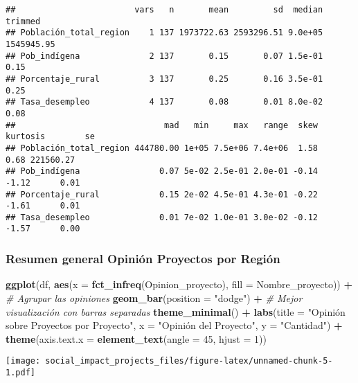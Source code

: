 \documentclass[
]{article}
\newenvironment{Shaded}{\begin{snugshade}}{\end{snugshade}}
\newcommand{\AttributeTok}[1]{\textcolor[rgb]{0.13,0.29,0.53}{#1}}
\newcommand{\CommentTok}[1]{\textcolor[rgb]{0.56,0.35,0.01}{\textit{#1}}}
\newcommand{\DecValTok}[1]{\textcolor[rgb]{0.00,0.00,0.81}{#1}}
\newcommand{\FunctionTok}[1]{\textcolor[rgb]{0.13,0.29,0.53}{\textbf{#1}}}
\newcommand{\NormalTok}[1]{#1}
\newcommand{\SpecialCharTok}[1]{\textcolor[rgb]{0.81,0.36,0.00}{\textbf{#1}}}
\newcommand{\StringTok}[1]{\textcolor[rgb]{0.31,0.60,0.02}{#1}}
\begin{document}
\begin{verbatim}
##                        vars   n       mean         sd  median    trimmed
## Población_total_region    1 137 1973722.63 2593296.51 9.0e+05 1545945.95
## Pob_indígena              2 137       0.15       0.07 1.5e-01       0.15
## Porcentaje_rural          3 137       0.25       0.16 3.5e-01       0.25
## Tasa_desempleo            4 137       0.08       0.01 8.0e-02       0.08
##                              mad   min     max   range  skew kurtosis        se
## Población_total_region 444780.00 1e+05 7.5e+06 7.4e+06  1.58     0.68 221560.27
## Pob_indígena                0.07 5e-02 2.5e-01 2.0e-01 -0.14    -1.12      0.01
## Porcentaje_rural            0.15 2e-02 4.5e-01 4.3e-01 -0.22    -1.61      0.01
## Tasa_desempleo              0.01 7e-02 1.0e-01 3.0e-02 -0.12    -1.57      0.00
\end{verbatim}

\subsubsection{\texorpdfstring{\textbf{Resumen general Opinión Proyectos
por
Región}}{Resumen general Opinión Proyectos por Región}}\label{resumen-general-opiniuxf3n-proyectos-por-regiuxf3n}

\begin{Shaded}
\begin{Highlighting}[]
\FunctionTok{ggplot}\NormalTok{(df, }\FunctionTok{aes}\NormalTok{(}\AttributeTok{x =} \FunctionTok{fct\_infreq}\NormalTok{(Opinion\_proyecto), }\AttributeTok{fill =}\NormalTok{ Nombre\_proyecto)) }\SpecialCharTok{+}  \CommentTok{\# Agrupar las opiniones}
  \FunctionTok{geom\_bar}\NormalTok{(}\AttributeTok{position =} \StringTok{"dodge"}\NormalTok{) }\SpecialCharTok{+}  \CommentTok{\# Mejor visualización con barras separadas}
  \FunctionTok{theme\_minimal}\NormalTok{() }\SpecialCharTok{+}
  \FunctionTok{labs}\NormalTok{(}\AttributeTok{title =} \StringTok{"Opinión sobre Proyectos por Proyecto"}\NormalTok{, }\AttributeTok{x =} \StringTok{"Opinión del Proyecto"}\NormalTok{, }\AttributeTok{y =} \StringTok{"Cantidad"}\NormalTok{) }\SpecialCharTok{+}
  \FunctionTok{theme}\NormalTok{(}\AttributeTok{axis.text.x =} \FunctionTok{element\_text}\NormalTok{(}\AttributeTok{angle =} \DecValTok{45}\NormalTok{, }\AttributeTok{hjust =} \DecValTok{1}\NormalTok{))}
\end{Highlighting}
\end{Shaded}

\texttt{[image: social\_impact\_projects\_files/figure-latex/unnamed-chunk-5-1.pdf]}
\end{document}
